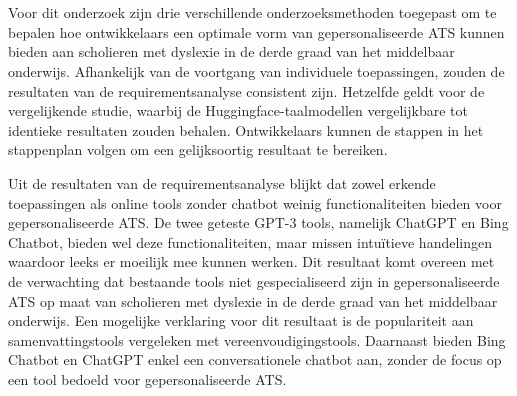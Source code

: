 
\chapter{}%
\label{ch:discussie}




Voor dit onderzoek zijn drie verschillende onderzoeksmethoden toegepast om te bepalen hoe ontwikkelaars een optimale vorm van gepersonaliseerde ATS kunnen bieden aan scholieren met dyslexie in de derde graad van het middelbaar onderwijs. Afhankelijk van de voortgang van individuele toepassingen, zouden de resultaten van de requirementsanalyse consistent zijn. Hetzelfde geldt voor de vergelijkende studie, waarbij de Huggingface-taalmodellen vergelijkbare tot identieke resultaten zouden behalen. Ontwikkelaars kunnen de stappen in het stappenplan volgen om een gelijksoortig resultaat te bereiken.



Uit de resultaten van de requirementsanalyse blijkt dat zowel erkende toepassingen als online tools zonder chatbot weinig functionaliteiten bieden voor gepersonaliseerde ATS. De twee geteste GPT-3 tools, namelijk ChatGPT en Bing Chatbot, bieden wel deze functionaliteiten, maar missen intuïtieve handelingen waardoor leeks er moeilijk mee kunnen werken. Dit resultaat komt overeen met de verwachting dat bestaande tools niet gespecialiseerd zijn in gepersonaliseerde ATS op maat van scholieren met dyslexie in de derde graad van het middelbaar onderwijs. Een mogelijke verklaring voor dit resultaat is de populariteit aan samenvattingstools vergeleken met vereenvoudigingstools. Daarnaast bieden Bing Chatbot en ChatGPT enkel een conversationele chatbot aan, zonder de focus op een tool bedoeld voor gepersonaliseerde ATS.


